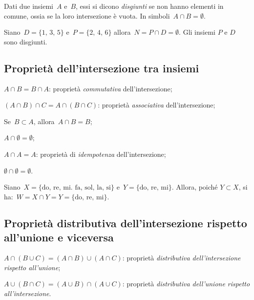 \begin{definizione}
Dati due insiemi~$A$ e~$B$, essi si dicono \emph{disgiunti} se non hanno elementi in comune, ossia se la loro intersezione è vuota. In simboli~$A \cap B = \emptyset$.
\end{definizione}

\begin{exrig}
 \begin{esempio}
Siano~$D=\{\text{1, 3, 5}\}$ e~$P=\{\text{2, 4, 6}\}$ allora~$N=P\cap D=\emptyset$. Gli insiemi $P$ e $D$ sono disgiunti.
\begin{center}
 
\end{center}
 \end{esempio}
\end{exrig}

\subsection{Proprietà dell'intersezione tra insiemi}

\begin{enumeratea}
\item $A\cap B=B\cap A$: proprietà \emph{commutativa} dell'intersezione;
\item $(A\cap B)\cap C=A\cap (B\cap C)$: proprietà \emph{associativa} dell'intersezione;
\item Se~$B\subset A$, allora~$A\cap B=B$;
\item $A\cap \emptyset =\emptyset$;
\item $A\cap A=A$: proprietà di \emph{idempotenza} dell'intersezione;
\item $\emptyset \cap \emptyset =\emptyset$.
\end{enumeratea}

\begin{exrig}
\begin{esempio}
Siano~$X=\{\text{do, re, mi. fa, sol, la, si}\}$
e~$Y=\{\text{do, re, mi}\}$. Allora, poiché $Y\subset X$, si ha:~$W=X\cap Y=Y=\{\text{do, re, mi}\}$.
\end{esempio}
\end{exrig}

\subsection[Proprietà distributiva dell'intersezione]{Proprietà distributiva dell'intersezione rispetto all'unione e viceversa}

\begin{enumeratea}
\item $A\cap (B\cup C)=(A\cap B)\cup (A\cap C)$: proprietà \emph{distributiva dell'intersezione rispetto all'unione};
\item $A\cup (B\cap C)=(A\cup B)\cap (A\cup C)$: proprietà \emph{distributiva dell'unione rispetto all'intersezione}.
\end{enumeratea}

